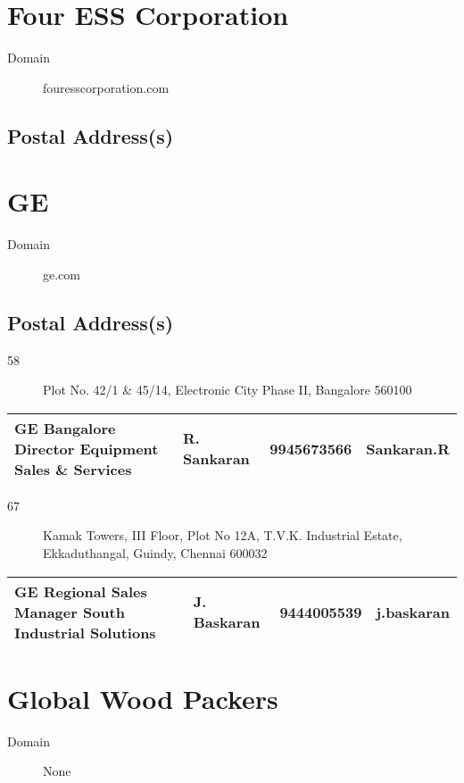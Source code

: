 \documentclass[a4paper, 11pt, twoside]{book}
\begin{document}
\section{Four ESS Corporation}\label{com:47}
\begin{description}
\item[Domain]fouresscorporation.com
\end{description}
\subsection*{Postal Address(s)}
\section{GE}\label{com:40}
\begin{description}
\item[Domain]ge.com
\end{description}
\subsection*{Postal Address(s)}
\begin{description}
\item [58]Plot No. 42/1 \& 45/14, Electronic City Phase II, Bangalore 560100
\end{description}
\begin{tabular}{|p{4cm}|p{2cm}|p{2cm}|p{3cm}|}
\hline
GE Bangalore Director Equipment Sales \& Services & R. Sankaran & 9945673566 & Sankaran.R \\ \hline
\end{tabular}
\begin{description}
\item [67]Kamak Towers, III Floor, Plot No 12A, T.V.K. Industrial Estate, Ekkaduthangal, Guindy, Chennai 600032
\end{description}
\begin{tabular}{|p{4cm}|p{2cm}|p{2cm}|p{3cm}|}
\hline
GE Regional Sales Manager South Industrial Solutions & J. Baskaran & 9444005539 & j.baskaran \\ \hline
\end{tabular}
\section{Global Wood Packers}\label{com:8}
\begin{description}
\item[Domain]None
\end{description}
\end{document}
